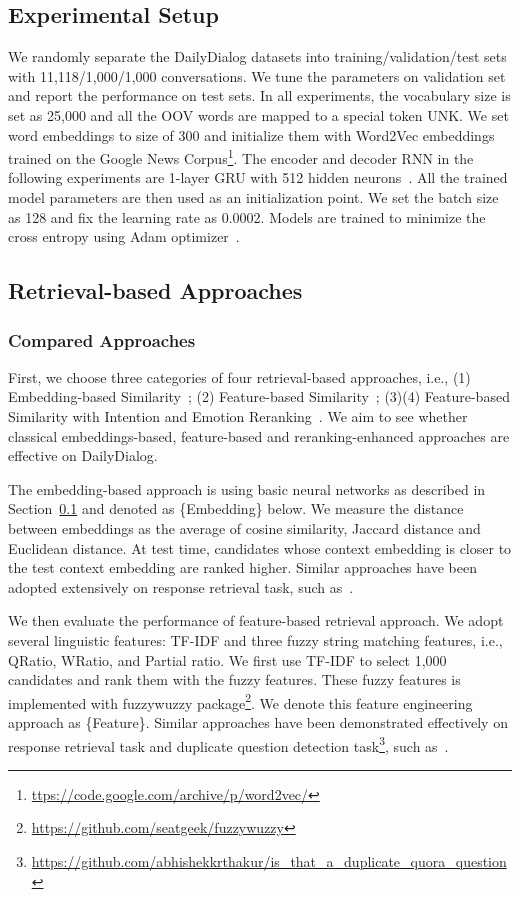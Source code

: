 \documentclass[11pt,letterpaper]{article}
\begin{document}
\subsection{Experimental Setup}
\label{sec:setup}
We randomly separate the DailyDialog datasets into training/validation/test sets with 11,118/1,000/1,000 conversations. We tune the parameters on validation set and report the performance on test sets. In all experiments, the vocabulary size is set as 25,000 and all the OOV words are mapped to a special token UNK. We set word embeddings to size of 300 and initialize them with Word2Vec embeddings trained on the Google News Corpus\footnote{\url{ttps://code.google.com/archive/p/word2vec/}}. The encoder and decoder RNN in the following experiments are 1-layer GRU with 512 hidden neurons~\cite{gru}. All the trained model parameters are then used as an initialization point. We set the batch size as 128 and fix the learning rate as 0.0002. Models are trained to minimize the cross entropy using Adam optimizer~\cite{kingma2014adam}.

\subsection{Retrieval-based Approaches}
\subsubsection{Compared Approaches}
First, we choose three categories of four retrieval-based approaches, i.e., (1) Embedding-based Similarity~\cite{luocombination}; (2) Feature-based Similarity~\cite{jafarpour2010filter,docchat}; (3)(4) Feature-based Similarity with Intention and Emotion Reranking~\cite{luocombination,otsuka2017utterance}. We aim to see whether classical embeddings-based, feature-based and reranking-enhanced approaches are effective on DailyDialog.

 The embedding-based approach is using basic neural networks as described in Section~\ref{sec:setup} and denoted as \{Embedding\} below. We measure the distance between embeddings as the average of cosine similarity, Jaccard distance and Euclidean distance. At test time, candidates whose context embedding is closer to the test context embedding are ranked higher. Similar approaches have been adopted extensively on response retrieval task, such as~\citet{luocombination}.

 We then evaluate the performance of feature-based retrieval approach. We adopt several linguistic features: TF-IDF and three fuzzy string matching features, i.e., QRatio, WRatio, and Partial ratio. We first use TF-IDF to select 1,000 candidates and rank them with the fuzzy features. These fuzzy features is implemented with fuzzywuzzy package\footnote{\url{https://github.com/seatgeek/fuzzywuzzy}}. We denote this feature engineering approach as \{Feature\}. Similar approaches have been demonstrated effectively on response retrieval task and duplicate question detection task\footnote{\url{https://github.com/abhishekkrthakur/is_that_a_duplicate_quora_question}}, such as~\citet{docchat,luocombination}.
\end{document}
